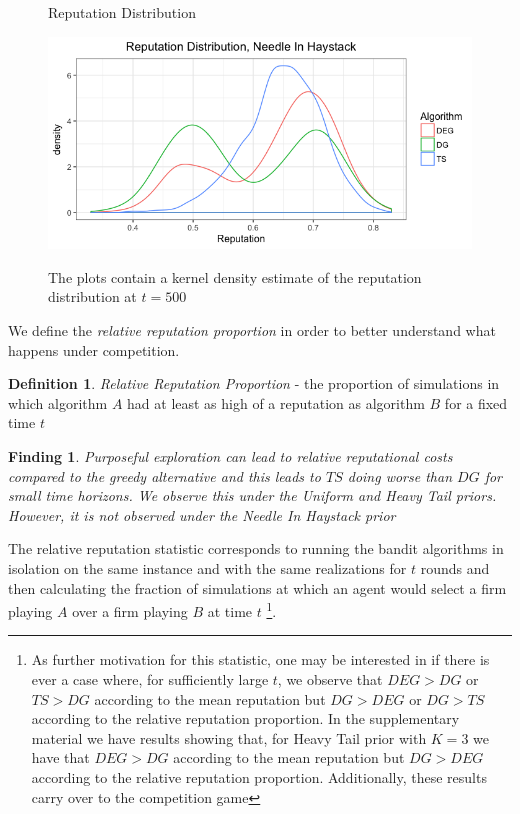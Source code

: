 \documentclass{article}
\theoremstyle{definition}
\newtheorem{definition}{Definition}
\newtheorem{finding}{Finding}
\begin{document}
\begin{figure}
\caption{Reputation Distribution}
\includegraphics[scale=0.35]{figures/rep_distribution_nih}
\label{rep_dist_nih}
\caption*{\tiny{The plots contain a kernel density estimate of the reputation distribution at $t = 500$}}
\end{figure} 


We define the \textit{relative reputation proportion} in order to better understand what happens under competition.

\begin{definition}
\textit{Relative Reputation Proportion} - the proportion of simulations in which algorithm $A$ had at least as high of a reputation as algorithm $B$ for a fixed time $t$
\end{definition}


\begin{finding}
\textit{Purposeful exploration can lead to relative reputational costs compared to the greedy alternative and this leads to $TS$ doing worse than $DG$ for small time horizons. We observe this under the Uniform and Heavy Tail priors. However, it is not observed under the Needle In Haystack prior}
\end{finding}

The relative reputation statistic corresponds to running the bandit algorithms in isolation on the same instance and with the same realizations for $t$ rounds and then calculating the fraction of simulations at which an agent would select a firm playing $A$ over a firm playing $B$ at time $t$ \footnote{As further motivation for this statistic, one may be interested in if there is ever a case where, for sufficiently large $t$, we observe that $DEG >DG$ or $TS > DG$ according to the mean reputation but $DG > DEG$ or $DG > TS$ according to the relative reputation proportion. In the supplementary material we have results showing that, for Heavy Tail prior with $K=3$ we have that $DEG > DG$ according to the mean reputation but $DG > DEG$ according to the relative reputation proportion. Additionally, these results carry over to the competition game}.
\end{document}
